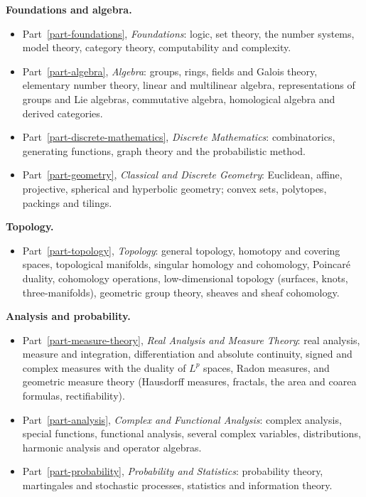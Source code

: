 \medskip\noindent\textbf{Foundations and algebra.}
\begin{itemize}
\item Part~\ref{part-foundations}, \emph{Foundations}: logic, set theory, the
number systems, model theory, category theory, computability and complexity.
\item Part~\ref{part-algebra}, \emph{Algebra}: groups, rings, fields and Galois
theory, elementary number theory, linear and multilinear algebra,
representations of groups and Lie algebras, commutative algebra, homological
algebra and derived categories.
\item Part~\ref{part-discrete-mathematics}, \emph{Discrete Mathematics}:
combinatorics, generating functions, graph theory and the probabilistic
method.
\item Part~\ref{part-geometry}, \emph{Classical and Discrete Geometry}: Euclidean,
affine, projective, spherical and hyperbolic geometry; convex sets, polytopes,
packings and tilings.
\end{itemize}

\noindent\textbf{Topology.}
\begin{itemize}
\item Part~\ref{part-topology}, \emph{Topology}: general topology, homotopy and
covering spaces, topological manifolds, singular homology and cohomology,
Poincar\'e duality, cohomology operations, low-dimensional topology (surfaces,
knots, three-manifolds), geometric group theory, sheaves and sheaf cohomology.
\end{itemize}

\noindent\textbf{Analysis and probability.}
\begin{itemize}
\item Part~\ref{part-measure-theory}, \emph{Real Analysis and Measure Theory}:
real analysis, measure and integration, differentiation and absolute
continuity, signed and complex measures with the duality of $L^p$ spaces, Radon
measures, and geometric measure theory (Hausdorff measures,
fractals, the area and coarea formulas, rectifiability).
\item Part~\ref{part-analysis}, \emph{Complex and Functional Analysis}: complex
analysis, special functions, functional analysis, several complex variables,
distributions, harmonic analysis and operator algebras.
\item Part~\ref{part-probability}, \emph{Probability and Statistics}:
probability theory, martingales and stochastic processes, statistics and
information theory.
\end{itemize}

